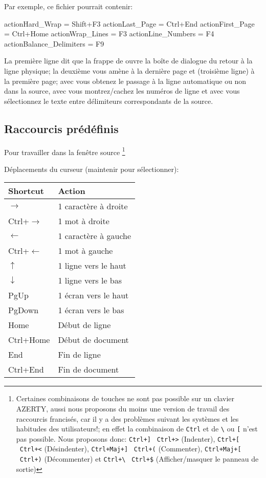 Par exemple, ce fichier pourrait contenir:
\begin{verbExample}
actionHard_Wrap = Shift+F3
actionLast_Page = Ctrl+End
actionFirst_Page = Ctrl+Home
actionWrap_Lines = F3
actionLine_Numbers = F4
actionBalance_Delimiters = F9
\end{verbExample}

La première ligne dit que la frappe de  ouvre la boîte de dialogue du retour à la ligne physique; la deuxième  vous amène à la dernière page et  (troisième ligne) à la première page; avec  vous obtenez le passage à la ligne automatique ou non dans la source, avec  vous montrez/cachez les numéros de ligne et avec  vous sélectionnez le texte entre délimiteurs correspondants de la source.

\subsection{Raccourcis prédéfinis}

Pour travailler dans la fenêtre source \footnote{Certaines combinaisons de touches ne sont pas possible sur un clavier AZERTY, aussi nous proposons du moins une version de travail des raccourcis francisés, car il y a des problèmes suivant les systèmes et les habitudes des utilisateurs!; en effet la combinaison de \verb|Ctrl| et de \verb|\| ou \verb|[| n'est pas possible. Nous proposons donc: \verb|Ctrl+]| \submenu\ \verb|Ctrl+>| (Indenter), \verb|Ctrl+[| \submenu\ \verb|Ctrl+<| (Désindenter), \verb|Ctrl+Maj+]| \submenu\ \verb|Ctrl+(| (Commenter), \verb|Ctrl+Maj+[| \submenu\ \verb|Ctrl+)| (Décommenter) et \verb|Ctrl+\| \submenu\ \verb|Ctrl+$| (Afficher/masquer le panneau de sortie)}


Déplacements du curseur (maintenir  pour sélectionner):
\begin{longtable}{Pl}
\toprule
Shortcut & Action \\
\midrule \endhead
$\rightarrow$      & 1 caractère à droite\\
Ctrl+$\rightarrow$ & 1 mot à droite\\
$\leftarrow$       & 1 caractère à gauche\\
Ctrl+$\leftarrow$  & 1 mot à gauche\\
$\uparrow$         & 1 ligne vers le haut\\
$\downarrow$       & 1 ligne vers le bas\\
PgUp               & 1 écran vers le haut\\
PgDown             & 1 écran vers le bas\\
Home               & Début de ligne\\
Ctrl+Home          & Début de document\\
End                & Fin de ligne\\
Ctrl+End           & Fin de document\\
\bottomrule
\end{longtable}

